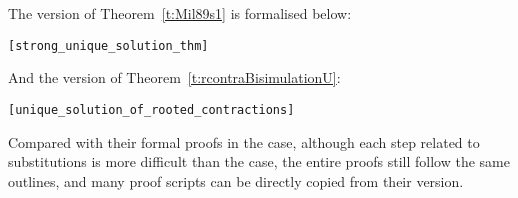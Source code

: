 The \multivariate version of Theorem~\ref{t:Mil89s1} is formalised
below:
\begin{alltt}
\HOLTokenTurnstile{}    \HOLSymConst{\HOLTokenConj{}}    \HOLSymConst{\HOLTokenConj{}}
    \HOLSymConst{\HOLTokenIn{}}     \HOLSymConst{\HOLTokenConj{}}
    \HOLSymConst{\HOLTokenIn{}}     \HOLSymConst{\HOLTokenImp{}}
    \HOLSymConst{\HOLTokenStrongEQ} \hfill{[strong_unique_solution_thm]}
\end{alltt}

And the \multivariate version of Theorem~\ref{t:rcontraBisimulationU}:
\begin{alltt}
\HOLTokenTurnstile{}    \HOLSymConst{\HOLTokenConj{}}    \HOLSymConst{\HOLTokenConj{}}
    \HOLSymConst{\HOLTokenIn{}}     \HOLSymConst{\HOLTokenConj{}}
    \HOLSymConst{\HOLTokenIn{}}     \HOLSymConst{\HOLTokenImp{}}
    \HOLSymConst{\HOLTokenObsCongr} \hfill{[unique_solution_of_rooted_contractions]}
\end{alltt}

Compared with their formal proofs in the \univariate case, although each
step related to \multivariate substitutions is more difficult than
the \univariate case, the entire proofs still follow the same outlines,
and many proof scripts can be directly copied from their \univariate version.
